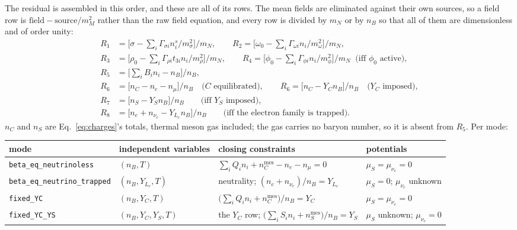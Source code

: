 \documentclass[aps,prc,onecolumn,superscriptaddress,nofootinbib,10pt]{revtex4-2}
\newcommand{\nB}{n_B}
\newcommand{\muS}{\mu_S}
\newcommand{\munue}{\mu_{\nu_e}}
\begin{document}
The residual is assembled in this order, and these are all of its rows. The
mean fields are eliminated against their own sources, so a field row is
$\text{field} - \text{source}/m_M^2$ rather than the raw field equation, and
every row is divided by $m_N$ or by $\nB$ so that all of them are
dimensionless and of order unity:
%
\begin{align}
R_1 &= \Big[ \sigma - \textstyle\sum_i \Gamma_{\sigma i} n^s_i \big/ m_\sigma^2
        \Big] \big/ m_N ,
\qquad
R_2 = \Big[ \omega_0 - \textstyle\sum_i \Gamma_{\omega i} n_i \big/ m_\omega^2
        \Big] \big/ m_N ,
\nonumber\\
R_3 &= \Big[ \rho_0 - \textstyle\sum_i \Gamma_{\rho i} t_{3i} n_i
        \big/ m_\rho^2 \Big] \big/ m_N ,
\qquad
R_4 = \Big[ \phi_0 - \textstyle\sum_i \Gamma_{\phi i} n_i \big/ m_\phi^2
        \Big] \big/ m_N
\;\;\text{(iff $\phi_0$ active)} ,
\nonumber\\
R_5 &= \Big[ \textstyle\sum_i B_i n_i - \nB \Big] \big/ \nB ,
\label{eq:residual}\\
R_6 &= \Big[ n_C - n_e - n_\mu \Big] \big/ \nB
        \quad\text{($C$ equilibrated)} ,
\qquad
R_6 = \Big[ n_C - Y_C \nB \Big] \big/ \nB
        \quad\text{($Y_C$ imposed)} ,
\nonumber\\
R_7 &= \Big[ n_S - Y_S \nB \Big] \big/ \nB
        \qquad \text{(iff $Y_S$ imposed)} ,
\nonumber\\
R_8 &= \Big[ n_e + n_{\nu_e} - Y_{L_e} \nB \Big] \big/ \nB
        \qquad \text{(iff the electron family is trapped)} .
\nonumber
\end{align}
%
$n_C$ and $n_S$ are Eq.~\eqref{eq:charges}'s totals, thermal meson gas
included; the gas carries no baryon number, so it is absent from $R_5$. Per
mode:
%
\begin{center}
\begin{tabular}{llll}
\toprule
mode & independent variables & closing constraints & potentials \\
\midrule
\texttt{beta\_eq\_neutrinoless} & $(\nB, T)$ &
  $\sum_i Q_i n_i + n_C^{\mathrm{mes}} - n_e - n_\mu = 0$ &
  $\muS = \munue = 0$ \\
\texttt{beta\_eq\_neutrino\_trapped} & $(\nB, Y_{L_e}, T)$ &
  neutrality; $(n_e + n_{\nu_e})/\nB = Y_{L_e}$ &
  $\muS = 0$; $\munue$ unknown \\
\texttt{fixed\_YC} & $(\nB, Y_C, T)$ &
  $\big(\textstyle\sum_i Q_i n_i + n_C^{\mathrm{mes}}\big)/\nB = Y_C$ &
  $\muS = \munue = 0$ \\
\texttt{fixed\_YC\_YS} & $(\nB, Y_C, Y_S, T)$ &
  the $Y_C$ row; $\big(\textstyle\sum_i S_i n_i + n_S^{\mathrm{mes}}\big)/\nB = Y_S$ &
  $\muS$ unknown; $\munue = 0$ \\
\bottomrule
\end{tabular}
\end{center}
\end{document}
